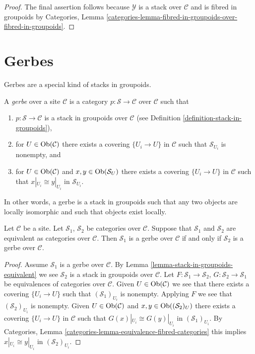\begin{proof}
\medskip\noindent
The final assertion follows because $\mathcal{Y}$ is a stack over
$\mathcal{C}$ and is fibred in groupoids by
Categories, Lemma
\ref{categories-lemma-fibred-in-groupoids-over-fibred-in-groupoids}.
\end{proof}





\section{Gerbes}
\label{section-gerbes}

\noindent
Gerbes are a special kind of stacks in groupoids.

\begin{definition}
\label{definition-gerbe}
A {\it gerbe} over a site $\mathcal{C}$ is a category
$p : \mathcal{S} \to \mathcal{C}$ over $\mathcal{C}$ such that
\begin{enumerate}
\item $p : \mathcal{S} \to \mathcal{C}$ is a stack
in groupoids over $\mathcal{C}$ (see
Definition \ref{definition-stack-in-groupoids}),
\item for $U \in \mathop{\mathrm{Ob}}\nolimits(\mathcal{C})$ there exists
a covering $\{U_i \to U\}$ in $\mathcal{C}$ such that
$\mathcal{S}_{U_i}$ is nonempty, and
\item for $U \in \mathop{\mathrm{Ob}}\nolimits(\mathcal{C})$ and
$x, y \in \mathop{\mathrm{Ob}}\nolimits(\mathcal{S}_U)$ there exists
a covering $\{U_i \to U\}$ in $\mathcal{C}$ such that
$x|_{U_i} \cong y|_{U_i}$ in $\mathcal{S}_{U_i}$.
\end{enumerate}
\end{definition}

\noindent
In other words, a gerbe is a stack in groupoids such that any two objects
are locally isomorphic and such that objects exist locally.

\begin{lemma}
\label{lemma-gerbe-equivalent}
Let $\mathcal{C}$ be a site.
Let $\mathcal{S}_1$, $\mathcal{S}_2$ be categories over $\mathcal{C}$.
Suppose that $\mathcal{S}_1$ and $\mathcal{S}_2$ are equivalent
as categories over $\mathcal{C}$.
Then $\mathcal{S}_1$ is a gerbe over $\mathcal{C}$ if and only if
$\mathcal{S}_2$ is a gerbe over $\mathcal{C}$.
\end{lemma}

\begin{proof}
Assume $\mathcal{S}_1$ is a gerbe over $\mathcal{C}$. By
Lemma \ref{lemma-stack-in-groupoids-equivalent}
we see $\mathcal{S}_2$ is a stack in groupoids over $\mathcal{C}$.
Let $F : \mathcal{S}_1 \to \mathcal{S}_2$,
$G : \mathcal{S}_2 \to \mathcal{S}_1$ be equivalences of categories over
$\mathcal{C}$. Given $U \in \mathop{\mathrm{Ob}}\nolimits(\mathcal{C})$ we see that there exists
a covering $\{U_i \to U\}$ such that $(\mathcal{S}_1)_{U_i}$ is
nonempty. Applying $F$ we see that $(\mathcal{S}_2)_{U_i}$ is nonempty.
Given $U \in \mathop{\mathrm{Ob}}\nolimits(\mathcal{C})$ and
$x, y \in \mathop{\mathrm{Ob}}\nolimits((\mathcal{S}_2)_U)$ there exists
a covering $\{U_i \to U\}$ in $\mathcal{C}$ such that
$G(x)|_{U_i} \cong G(y)|_{U_i}$ in $(\mathcal{S}_1)_{U_i}$. By
Categories, Lemma \ref{categories-lemma-equivalence-fibred-categories}
this implies $x|_{U_i} \cong y|_{U_i}$ in $(\mathcal{S}_2)_{U_i}$.
\end{proof}

